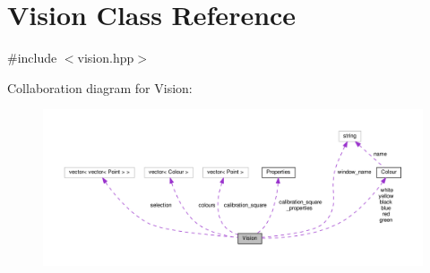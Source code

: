 \hypertarget{class_vision}{}\section{Vision Class Reference}
\label{class_vision}


{\ttfamily \#include $<$vision.\+hpp$>$}



Collaboration diagram for Vision\+:\nopagebreak
\begin{figure}[H]
\begin{center}
\leavevmode
\includegraphics[width=350pt]{class_vision__coll__graph}
\end{center}
\end{figure}
